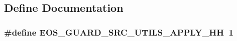 \subsection{Define Documentation}
\hypertarget{apply_8hh_a4328bcf6a6b86a72d4e546c8e99a0b5f}{
\subsubsection[{EOS\_\-GUARD\_\-SRC\_\-UTILS\_\-APPLY\_\-HH}]{\setlength{\rightskip}{0pt plus 5cm}\#define EOS\_\-GUARD\_\-SRC\_\-UTILS\_\-APPLY\_\-HH~1}}
\label{apply_8hh_a4328bcf6a6b86a72d4e546c8e99a0b5f}
